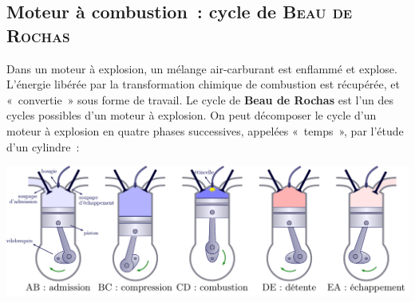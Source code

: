 \documentclass[../../main/main.tex]{subfiles}
\begin{document}
\vspace{-15pt}

\subsection{Moteur à combustion~: cycle de \textsc{Beau de Rochas}}
Dans un moteur à explosion, un mélange air-carburant est enflammé et explose.
L'énergie libérée par la transformation chimique de combustion est récupérée, et
«~convertie~» sous forme de travail. Le cycle de \textbf{Beau de Rochas} est l'un des cycles possibles d'un moteur à explosion. On peut
décomposer le cycle d'un moteur à explosion en quatre phases successives,
appelées «~temps~», par l'étude d'un
cylindre~:

\vspace{-15pt}
\noindent
\begin{minipage}[t]{\linewidth}
  \begin{center}
  \includegraphics[width=\linewidth]{comb_bdr}
  \label{fig:comb_bdr}
\end{center}
\end{minipage}
\end{document}
